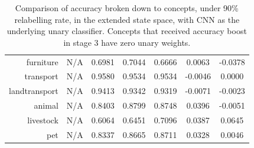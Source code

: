 \documentclass[11pt,a4paper]{article}
\begin{document}
\begin{table}[htbp]
\begin{tabular}{r|c|c|c|c|c|c}
furniture     & N/A    & 0.6981 & 0.7044 & 0.6666 & 0.0063 & -0.0378\\
transport     & N/A    & 0.9580 & 0.9534 & 0.9534 & -0.0046 & 0.0000\\
landtransport & N/A    & 0.9413 & 0.9342 & 0.9319 & -0.0071 & -0.0023\\
animal        & N/A    & 0.8403 & 0.8799 & 0.8748 & 0.0396 & -0.0051\\
livestock     & N/A    & 0.6064 & 0.6451 & 0.7096 & 0.0387 & 0.0645\\
pet           & N/A    & 0.8337 & 0.8665 & 0.8711 & 0.0328 & 0.0046
\end{tabular}
\caption{Comparison of accuracy broken down to concepts, under 90\% relabelling rate, in the extended state space, with CNN as the underlying unary classifier. Concepts that received accuracy boost in stage 3 have zero unary weights.}
\label{tab:cnn90acc}
\end{table}
\end{document}
